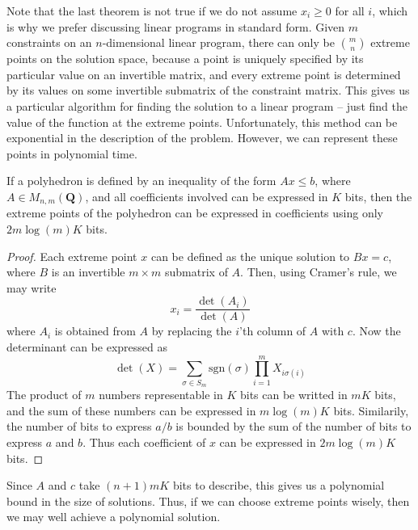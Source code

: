     Note that the last theorem is not true if we do not assume $x_i \geq 0$ for all $i$, which is why we prefer discussing linear programs in standard form. Given $m$ constraints on an $n$-dimensional linear program, there can only be ${m \choose n}$ extreme points on the solution space, because a point is uniquely specified by its particular value on an invertible matrix, and every extreme point is determined by its values on some invertible submatrix of the constraint matrix. This gives us a particular algorithm for finding the solution to a linear program -- just find the value of the function at the extreme points. Unfortunately, this method can be exponential in the description of the problem. However, we can represent these points in polynomial time.

    \begin{theorem}
        If a polyhedron is defined by an inequality of the form $Ax \leq b$, where $A \in M_{n,m}(\mathbf{Q})$, and all coefficients involved can be expressed in $K$ bits, then the extreme points of the polyhedron can be expressed in coefficients using only $2m \log(m) K$ bits.
    \end{theorem}
    \begin{proof}
        Each extreme point $x$ can be defined as the unique solution to $Bx = c$, where $B$ is an invertible $m \times m$ submatrix of $A$. Then, using Cramer's rule, we may write
        \[ x_i = \frac{\det(A_i)}{\det(A)} \]
        where $A_i$ is obtained from $A$ by replacing the $i$'th column of $A$ with $c$. Now the determinant can be expressed as
        \[ \det(X) = \sum_{\sigma \in S_m} \text{sgn}(\sigma) \prod_{i = 1}^m X_{i \sigma(i)} \]
        The product of $m$ numbers representable in $K$ bits can be writted in $mK$ bits, and the sum of these numbers can be expressed in $m \log(m) K$ bits. Similarily, the number of bits to express $a/b$ is bounded by the sum of the number of bits to express $a$ and $b$. Thus each coefficient of $x$ can be expressed in $2m \log(m) K$ bits.
    \end{proof}

    Since $A$ and $c$ take $(n + 1)mK$ bits to describe, this gives us a polynomial bound in the size of solutions. Thus, if we can choose extreme points wisely, then we may well achieve a polynomial solution.

